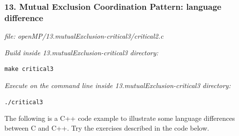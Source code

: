 \documentclass[letterpaper,10pt,openany,oneside]{sphinxmanual}
\begin{document}
\subsubsection{13.  Mutual Exclusion Coordination Pattern: language difference}
\label{SharedMemory/MutualExclusion:mutual-exclusion-coordination-pattern-language-difference}
\emph{file: openMP/13.mutualExclusion-critical3/critical2.c}

\emph{Build inside 13.mutualExclusion-critical3 directory:}

\begin{Verbatim}[commandchars=\\\{\}]
make critical3
\end{Verbatim}

\emph{Execute on the command line inside 13.mutualExclusion-critical3 directory:}

\begin{Verbatim}[commandchars=\\\{\}]
./critical3
\end{Verbatim}

The following is a C++ code example to illustrate some language differences between C and C++.  Try the exercises described in the code below.
\end{document}
